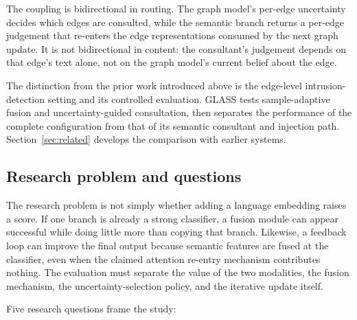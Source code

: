 The coupling is bidirectional in routing. The graph model's per-edge uncertainty decides
which edges are consulted, while the semantic branch returns a per-edge judgement that
re-enters the edge representations consumed by the next graph update. It is not
bidirectional in content: the consultant's judgement depends on that edge's text alone,
not on the graph model's current belief about the edge.

The distinction from the prior work introduced above is the edge-level intrusion-detection setting and its controlled evaluation. GLASS tests sample-adaptive fusion and uncertainty-guided consultation, then separates the performance of the complete configuration from that of its semantic consultant and injection path. Section~\ref{sec:related} develops the comparison with earlier systems.

\subsection{Research problem and questions}

The research problem is not simply whether adding a language embedding raises a score.
If one branch is already a strong classifier, a fusion module can appear successful while
doing little more than copying that branch. Likewise, a feedback loop can improve the
final output because semantic features are fused at the classifier, even when the claimed
attention re-entry mechanism contributes nothing. The evaluation must separate
the value of the two modalities, the fusion mechanism, the uncertainty-selection policy,
and the iterative update itself.

Five research questions frame the study:

